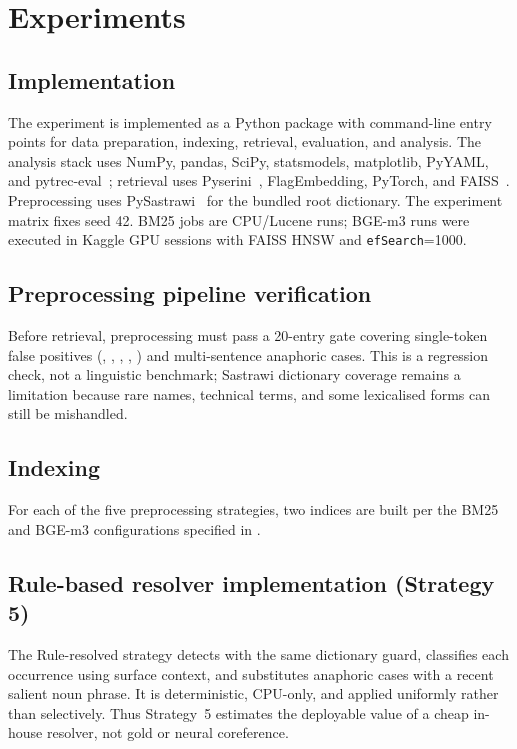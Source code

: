 \section{Experiments}
\label{sec:experiments}

\subsection{Implementation}

The experiment is implemented as a Python package with command-line entry points for data preparation, indexing, retrieval, evaluation, and analysis. The analysis stack uses NumPy, pandas, SciPy, statsmodels, matplotlib, PyYAML, and pytrec-eval~\cite{vangysel2018pytrec_eval}; retrieval uses Pyserini~\cite{lin2021pyserini}, FlagEmbedding, PyTorch, and FAISS~\cite{douze2024faiss}. Preprocessing uses PySastrawi~\cite{sastrawi} for the bundled root dictionary. The experiment matrix fixes seed 42. BM25 jobs are CPU/Lucene runs; BGE-m3 runs were executed in Kaggle GPU sessions with FAISS HNSW and \texttt{efSearch}=1000.

\subsection{Preprocessing pipeline verification}

Before retrieval, preprocessing must pass a 20-entry gate covering single-token false positives (, , , , ) and multi-sentence anaphoric cases. This is a regression check, not a linguistic benchmark; Sastrawi dictionary coverage remains a limitation because rare names, technical terms, and some lexicalised forms can still be mishandled.

\subsection{Indexing}

For each of the five preprocessing strategies, two indices are built per the BM25 and BGE-m3 configurations specified in .

\subsection{Rule-based resolver implementation (Strategy 5)}

The Rule-resolved strategy detects  with the same dictionary guard, classifies each occurrence using surface context, and substitutes anaphoric cases with a recent salient noun phrase. It is deterministic, CPU-only, and applied uniformly rather than selectively. Thus Strategy~5 estimates the deployable value of a cheap in-house resolver, not gold or neural coreference.

